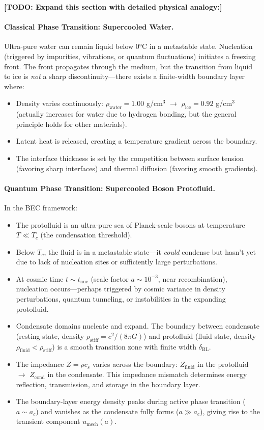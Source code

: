 \documentclass[11pt,a4paper]{article}
\newcommand{\rhostiff}{\ensuremath{\rho_{\mathrm{stiff}}}}
\newcommand{\umech}{\ensuremath{u_{\mathrm{mech}}}}
\newcommand{\ac}{\ensuremath{a_c}}
\newcommand{\rhofluid}{\ensuremath{\rho_{\mathrm{fluid}}}}
\newcommand{\Zfluid}{\ensuremath{Z_{\mathrm{fluid}}}}
\newcommand{\Zcond}{\ensuremath{Z_{\mathrm{cond}}}}
\newcommand{\deltaBL}{\ensuremath{\delta_{\mathrm{BL}}}}
\newcommand{\Tc}{\ensuremath{T_c}}
\theoremstyle{definition}
\theoremstyle{remark}
\begin{document}
\textbf{[TODO: Expand this section with detailed physical analogy:]}

\paragraph{Classical Phase Transition: Supercooled Water.}
Ultra-pure water can remain liquid below 0°C in a metastable state. Nucleation (triggered by impurities, vibrations, or quantum fluctuations) initiates a freezing front. The front propagates through the medium, but the transition from liquid to ice is \emph{not} a sharp discontinuity---there exists a finite-width boundary layer where:
\begin{itemize}[leftmargin=*, itemsep=0.3em]
\item Density varies continuously: $\rho_{\mathrm{water}} = 1.00$ g/cm$^3$ $\to$ $\rho_{\mathrm{ice}} = 0.92$ g/cm$^3$ (actually increases for water due to hydrogen bonding, but the general principle holds for other materials).
\item Latent heat is released, creating a temperature gradient across the boundary.
\item The interface thickness is set by the competition between surface tension (favoring sharp interfaces) and thermal diffusion (favoring smooth gradients).
\end{itemize}

\paragraph{Quantum Phase Transition: Supercooled Boson Protofluid.}
In the BEC framework:
\begin{itemize}[leftmargin=*, itemsep=0.3em]
\item The protofluid is an ultra-pure sea of Planck-scale bosons at temperature $T \ll \Tc$ (the condensation threshold).
\item Below $\Tc$, the fluid is in a metastable state---it \emph{could} condense but hasn't yet due to lack of nucleation sites or sufficiently large perturbations.
\item At cosmic time $t \sim t_{\mathrm{nuc}}$ (scale factor $a \sim 10^{-3}$, near recombination), nucleation occurs---perhaps triggered by cosmic variance in density perturbations, quantum tunneling, or instabilities in the expanding protofluid.
\item Condensate domains nucleate and expand. The boundary between condensate (resting state, density $\rhostiff = c^2/(8\pi G)$) and protofluid (fluid state, density $\rhofluid < \rhostiff$) is a smooth transition zone with finite width $\deltaBL$.
\item The impedance $Z = \rho c_s$ varies across the boundary: $\Zfluid$ in the protofluid $\to$ $\Zcond$ in the condensate. This impedance mismatch determines energy reflection, transmission, and storage in the boundary layer.
\item The boundary-layer energy density peaks during active phase transition ($a \sim \ac$) and vanishes as the condensate fully forms ($a \gg \ac$), giving rise to the transient component $\umech(a)$.
\end{itemize}
\end{document}
